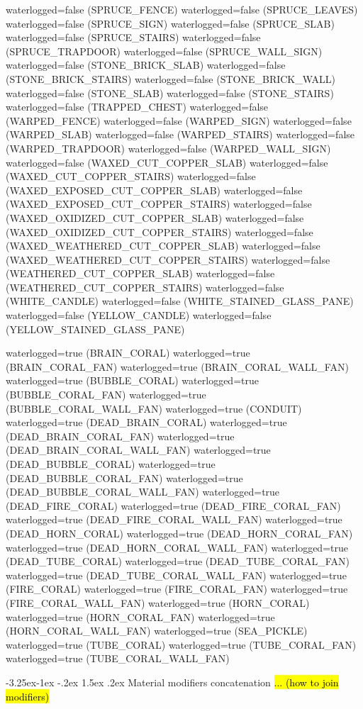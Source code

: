 \documentclass[11pt]{article}
\makeatletter
\renewcommand\subsection{\@startsection{subsection}{2}{\z@}%
                                         {-3.25ex\@plus -1ex \@minus -.2ex}%
                                         {1.5ex \@plus .2ex}%
                                         {\normalfont\fontfamily{phv}\fontsize{14}{17}\bfseries}}
\newcommand\myworries[1]{\sethlcolor{red}\hl{#1}}
\makeatother
\begin{document}
waterlogged=false (SPRUCE_FENCE)
waterlogged=false (SPRUCE_LEAVES)
waterlogged=false (SPRUCE_SIGN)
waterlogged=false (SPRUCE_SLAB)
waterlogged=false (SPRUCE_STAIRS)
waterlogged=false (SPRUCE_TRAPDOOR)
waterlogged=false (SPRUCE_WALL_SIGN)
waterlogged=false (STONE_BRICK_SLAB)
waterlogged=false (STONE_BRICK_STAIRS)
waterlogged=false (STONE_BRICK_WALL)
waterlogged=false (STONE_SLAB)
waterlogged=false (STONE_STAIRS)
waterlogged=false (TRAPPED_CHEST)
waterlogged=false (WARPED_FENCE)
waterlogged=false (WARPED_SIGN)
waterlogged=false (WARPED_SLAB)
waterlogged=false (WARPED_STAIRS)
waterlogged=false (WARPED_TRAPDOOR)
waterlogged=false (WARPED_WALL_SIGN)
waterlogged=false (WAXED_CUT_COPPER_SLAB)
waterlogged=false (WAXED_CUT_COPPER_STAIRS)
waterlogged=false (WAXED_EXPOSED_CUT_COPPER_SLAB)
waterlogged=false (WAXED_EXPOSED_CUT_COPPER_STAIRS)
waterlogged=false (WAXED_OXIDIZED_CUT_COPPER_SLAB)
waterlogged=false (WAXED_OXIDIZED_CUT_COPPER_STAIRS)
waterlogged=false (WAXED_WEATHERED_CUT_COPPER_SLAB)
waterlogged=false (WAXED_WEATHERED_CUT_COPPER_STAIRS)
waterlogged=false (WEATHERED_CUT_COPPER_SLAB)
waterlogged=false (WEATHERED_CUT_COPPER_STAIRS)
waterlogged=false (WHITE_CANDLE)
waterlogged=false (WHITE_STAINED_GLASS_PANE)
waterlogged=false (YELLOW_CANDLE)
waterlogged=false (YELLOW_STAINED_GLASS_PANE)

waterlogged=true (BRAIN_CORAL)
waterlogged=true (BRAIN_CORAL_FAN)
waterlogged=true (BRAIN_CORAL_WALL_FAN)
waterlogged=true (BUBBLE_CORAL)
waterlogged=true (BUBBLE_CORAL_FAN)
waterlogged=true (BUBBLE_CORAL_WALL_FAN)
waterlogged=true (CONDUIT)
waterlogged=true (DEAD_BRAIN_CORAL)
waterlogged=true (DEAD_BRAIN_CORAL_FAN)
waterlogged=true (DEAD_BRAIN_CORAL_WALL_FAN)
waterlogged=true (DEAD_BUBBLE_CORAL)
waterlogged=true (DEAD_BUBBLE_CORAL_FAN)
waterlogged=true (DEAD_BUBBLE_CORAL_WALL_FAN)
waterlogged=true (DEAD_FIRE_CORAL)
waterlogged=true (DEAD_FIRE_CORAL_FAN)
waterlogged=true (DEAD_FIRE_CORAL_WALL_FAN)
waterlogged=true (DEAD_HORN_CORAL)
waterlogged=true (DEAD_HORN_CORAL_FAN)
waterlogged=true (DEAD_HORN_CORAL_WALL_FAN)
waterlogged=true (DEAD_TUBE_CORAL)
waterlogged=true (DEAD_TUBE_CORAL_FAN)
waterlogged=true (DEAD_TUBE_CORAL_WALL_FAN)
waterlogged=true (FIRE_CORAL)
waterlogged=true (FIRE_CORAL_FAN)
waterlogged=true (FIRE_CORAL_WALL_FAN)
waterlogged=true (HORN_CORAL)
waterlogged=true (HORN_CORAL_FAN)
waterlogged=true (HORN_CORAL_WALL_FAN)
waterlogged=true (SEA_PICKLE)
waterlogged=true (TUBE_CORAL)
waterlogged=true (TUBE_CORAL_FAN)
waterlogged=true (TUBE_CORAL_WALL_FAN)


\subsection{Material modifiers concatenation}
\myworries{... (how to join modifiers)}
\end{document}
